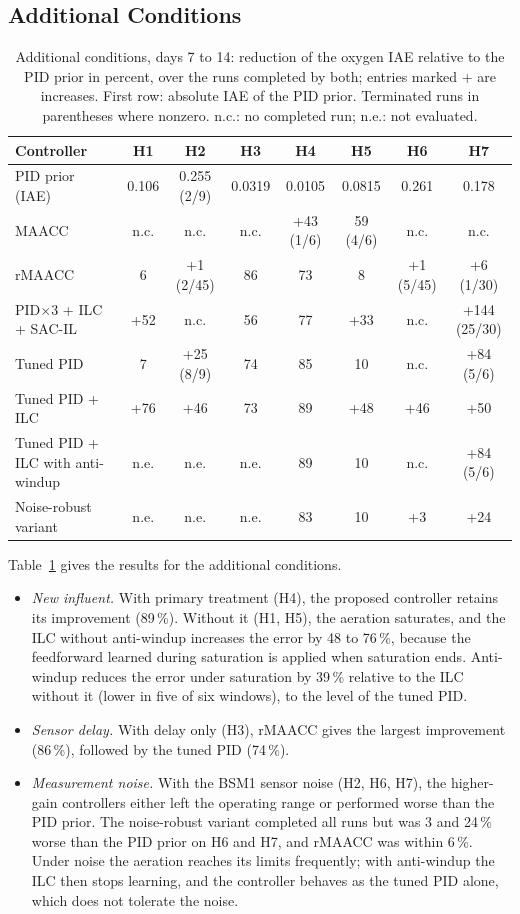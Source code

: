 \documentclass[journal]{IEEEtran}
\newcommand{\nc}{n.c.}
\newcommand{\nev}{n.e.}
\begin{document}
\subsection{Additional Conditions}

\begin{table}[!t]
\centering
\caption{Additional conditions, days 7 to 14: reduction of the oxygen IAE
relative to the PID prior in percent, over the runs completed by both; entries
marked + are increases. First row: absolute IAE of the PID prior. Terminated
runs in parentheses where nonzero. n.c.: no completed run; n.e.: not
evaluated.}
\label{tab:heldout}
\setlength{\tabcolsep}{4pt}
\begin{tabular}{lccccccc}
\toprule
Controller & H1 & H2 & H3 & H4 & H5 & H6 & H7\\
\midrule
PID prior (IAE) & 0.106 & 0.255 (2/9) & 0.0319 & 0.0105 & 0.0815 & 0.261 & 0.178\\
MAACC & \nc & \nc & \nc & +43 (1/6) & 59 (4/6) & \nc & \nc\\
rMAACC & 6 & +1 (2/45) & 86 & 73 & 8 & +1 (5/45) & +6 (1/30)\\
PID$\times$3 + ILC + SAC-IL & +52 & \nc & 56 & 77 & +33 & \nc & +144 (25/30)\\
Tuned PID & 7 & +25 (8/9) & 74 & 85 & 10 & \nc & +84 (5/6)\\
Tuned PID + ILC & +76 & +46 & 73 & 89 & +48 & +46 & +50\\
Tuned PID + ILC with anti-windup & \nev & \nev & \nev & 89 & 10 & \nc & +84 (5/6)\\
Noise-robust variant & \nev & \nev & \nev & 83 & 10 & +3 & +24\\
\bottomrule
\end{tabular}
\end{table}

Table~\ref{tab:heldout} gives the results for the additional conditions.
\begin{itemize}
\item \emph{New influent.} With primary treatment (H4), the proposed
  controller retains its improvement (89\,\%). Without it (H1, H5), the
  aeration saturates, and the ILC without anti-windup increases the error by
  48 to 76\,\%, because the feedforward learned during saturation is applied
  when saturation ends. Anti-windup reduces the error under saturation by
  39\,\% relative to the ILC without it (lower in five of six windows), to
  the level of the tuned PID.
\item \emph{Sensor delay.} With delay only (H3), rMAACC gives the largest
  improvement (86\,\%), followed by the tuned PID (74\,\%).
\item \emph{Measurement noise.} With the BSM1 sensor noise (H2, H6, H7),
  the higher-gain controllers either left the operating range or performed
  worse than the PID prior. The noise-robust variant completed all runs but
  was 3 and 24\,\% worse than the PID prior on H6 and H7, and rMAACC was
  within 6\,\%. Under noise the aeration reaches its limits frequently;
  with anti-windup the ILC then stops learning, and the controller behaves
  as the tuned PID alone, which does not tolerate the noise.
\end{itemize}
\end{document}
